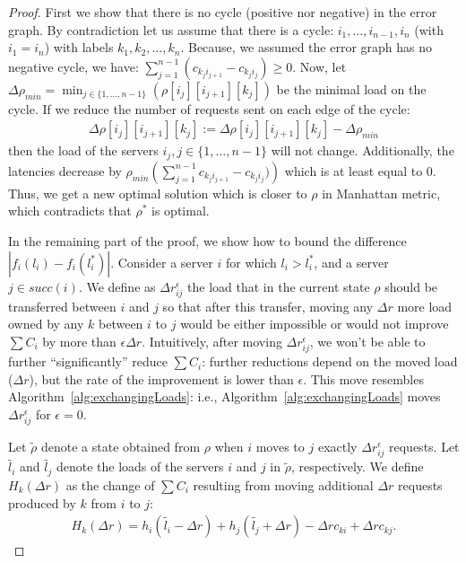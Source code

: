 \documentclass[11pt]{article}
\begin{document}
\begin{proof}
First we show that there is no cycle (positive nor negative) in the error graph. By contradiction let us assume that there is a cycle: $i_1, \ldots, i_{n-1}, i_{n}$ (with $i_1=i_n$) with labels $k_{1}, k_{2}, \ldots, k_{n}$.
Because, we assumed the error graph has no negative cycle, we have: $\sum_{j=1}^{n-1} ( c_{k_{j}i_{j+1}} - c_{k_{j}i_{j}} ) \geq 0$. 
Now, let $\Delta \rho_{\mathit{min}} = \min_{j \in \{1,\ldots, n-1\}}( \rho [i_{j}][i_{j+1}][k_{j}])$ be the minimal load on the cycle. If we reduce the number of requests sent on each edge of the cycle:
\begin{align*}
\Delta \rho [i_{j}][i_{j+1}][k_{j}] := \Delta \rho [i_{j}][i_{j+1}][k_{j}] - \Delta \rho_{\mathit{min}}
\end{align*}
then the load of the servers $i_{j}, j \in \{1, \ldots, n-1 \}$ will not change.
Additionally, the latencies decrease by $\rho_{\mathit{min}}\left(\sum_{j=1}^{n-1} c_{k_{j}i_{j+1}} - c_{k_{j}i_{j}}) \right)$ which is at least equal to 0. Thus, we get a new optimal solution which is closer to $\rho$ in Manhattan metric, which contradicts that $\rho^{*}$ is optimal.

In the remaining part of the proof, we show how to bound the difference $|f_i(l_{i}) - f_i(l^{*}_{i})|$.
Consider a server $i$ for which $l_{i} > l^{*}_{i}$, and a server $j \in succ(i)$. 
We define as $\Delta r^{\epsilon}_{ij}$ the load that in the current state $\rho$ should be transferred between $i$ and $j$ so that after this transfer, moving any $\Delta r$ more load owned by any $k$ between $i$ to $j$ would be either impossible or would not improve $\sum{C_i}$ by more than $\epsilon \Delta r$. 
Intuitively, after moving $\Delta r^{\epsilon}_{ij}$, we won't be able to further ``significantly'' reduce $\sum{C_i}$: further reductions depend on the moved load ($\Delta r$), but the rate of the improvement is lower than $\epsilon$. This move resembles Algorithm~\ref{alg:exchangingLoads}: i.e., Algorithm~\ref{alg:exchangingLoads} moves $\Delta r^{\epsilon}_{ij}$ for $\epsilon=0$.


Let $\tilde{\rho}$ denote a state obtained from $\rho$ when $i$ moves to $j$ exactly $\Delta r^{\epsilon}_{ij}$ requests.
Let $\tilde{l_i}$ and $\tilde{l_j}$ denote the loads of the servers $i$ and $j$ in $\tilde{\rho}$, respectively.
We define $H_k(\Delta r)$ as the change of $\sum{C_i}$ resulting from moving additional $\Delta r$ requests produced by $k$ from $i$ to $j$:
\begin{align*}
H_k(\Delta r) = h_i(\tilde{l_i} - \Delta r) + h_j(\tilde{l_j} + \Delta r) - \Delta r c_{ki} + \Delta r c_{kj} \textrm{.}
\end{align*}


\end{proof}
\end{document}
